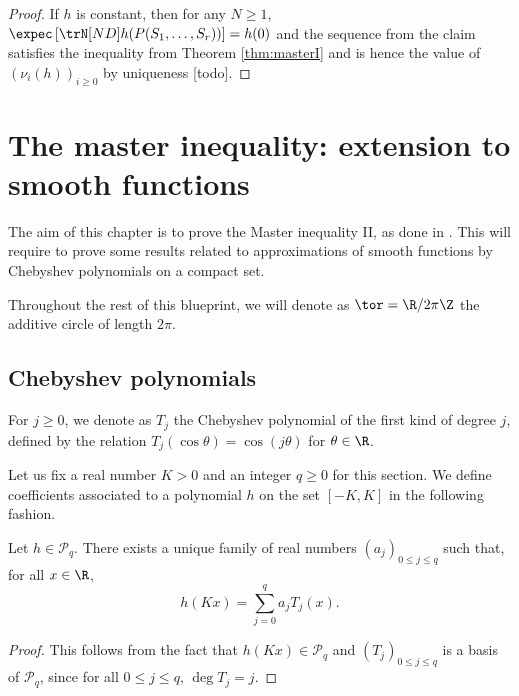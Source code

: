 \begin{proof}
  If $h$ is constant, then for any $N \geq 1$,
  $\expec\left[\trN[ND] h(P(S_1, \ldots, S_r))\right] = h(0)$
  and the sequence from the claim satisfies the inequality from Theorem \ref{thm:masterI} and
  is hence the value of $(\nu_i(h))_{i \geq 0}$ by uniqueness [todo].
\end{proof}


\chapter{The master inequality: extension to smooth functions}

The aim of this chapter is to prove the Master inequality II, as
done in \cite[Section 7]{chen2025}.
This will require to prove some results related to approximations
of smooth functions by Chebyshev polynomials on a compact set.

Throughout the rest of this blueprint,
we will denote as $\tor = \R / 2 \pi\Z$ the additive circle of length $2 \pi$.

\section{Chebyshev polynomials}

For $j \geq 0$, we denote as $T_j$ the Chebyshev polynomial of the first kind of degree $j$,
defined by the relation $T_j(\cos \theta) = \cos(j \theta)$ for $\theta \in \R$.

Let us fix a real number $K > 0$ and an integer $q \geq 0$ for this section.
We define coefficients associated to a polynomial $h$ on the set $[-K,K]$ in the following
fashion.

\begin{lemma}
  \label{lem:chebyshev_decomp}
  Let $h \in \mathcal{P}_q$.
  There exists a unique family of real numbers $(a_j)_{0 \leq j \leq q}$ such that,
  for all $x \in \R$,
  \begin{equation*}
    h(Kx) = \sum_{j=0}^q a_j T_j (x).
  \end{equation*}
\end{lemma}

\begin{proof}
  This follows from the fact that $h(Kx) \in \mathcal{P}_q$ and $(T_j)_{0 \leq j \leq q}$ is a basis of $\mathcal{P}_q$,
  since for all $0 \leq j \leq q$, $\deg T_j = j$.
\end{proof}

